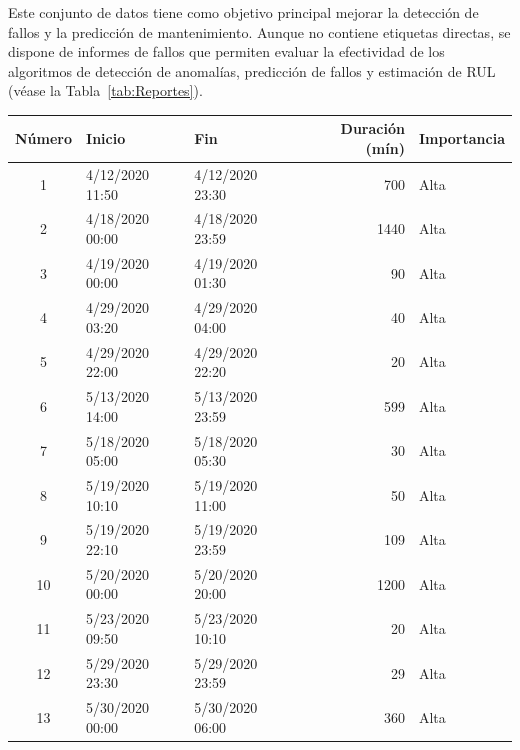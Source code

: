 \documentclass[12pt,letterpaper]{article}
\begin{document}
Este conjunto de datos tiene como objetivo principal mejorar la detección de fallos y la predicción de mantenimiento. 
Aunque no contiene etiquetas directas, se dispone de informes de fallos que permiten evaluar la efectividad de los algoritmos de detección de anomalías, predicción de fallos y estimación de RUL (véase la Tabla~\ref{tab:Reportes}).

\begin{table}[htp]
    \centering
\begin{tabular}{cllrl}
\hline
\textbf{Número} & \textbf{Inicio}       & \textbf{Fin}         & \textbf{Duración (mín)} & \textbf{Importancia} \\ \hline
1            & 4/12/2020 11:50          & 4/12/2020 23:30           & 700                & Alta              \\
2            & 4/18/2020 00:00          & 4/18/2020 23:59           & 1440               & Alta              \\
3            & 4/19/2020 00:00          & 4/19/2020 01:30           & 90                 & Alta              \\
4            & 4/29/2020 03:20          & 4/29/2020 04:00           & 40                 & Alta              \\
5            & 4/29/2020 22:00          & 4/29/2020 22:20           & 20                 & Alta              \\
6            & 5/13/2020 14:00          & 5/13/2020 23:59           & 599                & Alta              \\
7            & 5/18/2020 05:00          & 5/18/2020 05:30           & 30                 & Alta              \\
8            & 5/19/2020 10:10          & 5/19/2020 11:00           & 50                 & Alta              \\
9            & 5/19/2020 22:10          & 5/19/2020 23:59           & 109                & Alta              \\
10           & 5/20/2020 00:00          & 5/20/2020 20:00           & 1200               & Alta              \\
11           & 5/23/2020 09:50          & 5/23/2020 10:10           & 20                 & Alta              \\
12           & 5/29/2020 23:30          & 5/29/2020 23:59           & 29                 & Alta              \\
13           & 5/30/2020 00:00          & 5/30/2020 06:00           & 360                & Alta              \\

\end{tabular}
\end{table}
\end{document}
